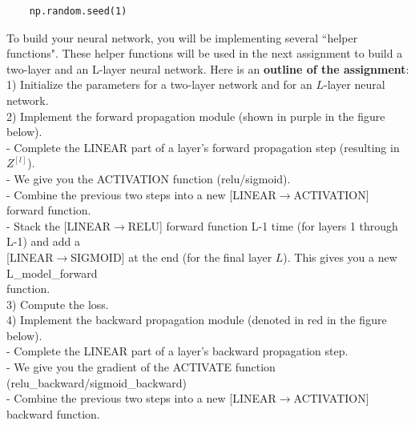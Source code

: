 \documentclass[11pt, a4paper]{article}
\begin{document}
\begin{spacing}{1.1}
\begin{lstlisting}
	np.random.seed(1) \end{lstlisting}
	To build your neural network, you will be implementing several ``helper functions". These helper functions will be used in the next assignment to build a two-layer and an L-layer neural network. Here is an \textbf{outline of the assignment}: \vspace*{1mm} \\
	\hspace*{3mm} 1) Initialize the parameters for a two-layer network and for an $L$-layer neural network. \\
	\hspace*{3mm} 2) Implement the forward propagation module (shown in purple in the figure below). \\
	\hspace*{7mm} - Complete the LINEAR part of a layer's forward propagation step (resulting in $Z^{[l]}$). \\
	\hspace*{7mm} - We give you the ACTIVATION function (relu/sigmoid). \\
	\hspace*{7mm} - Combine the previous two steps into a new [LINEAR$\rightarrow$ACTIVATION] forward function. \\
	\hspace*{7mm} - Stack the [LINEAR$\rightarrow$RELU] forward function L-1 time (for layers 1 through L-1) and add a \\ \hspace*{9.5mm} [LINEAR$\rightarrow$SIGMOID] at the end (for the final layer $L$). This gives you a new L\_model\_forward \\ \hspace*{9.5mm} function. \\
	\hspace*{3mm} 3) Compute the loss. \\
	\hspace*{3mm} 4) Implement the backward propagation module (denoted in red in the figure below). \\
	\hspace*{7mm} - Complete the LINEAR part of a layer's backward propagation step. \\
	\hspace*{7mm} - We give you the gradient of the ACTIVATE function (relu\_backward/sigmoid\_backward)  \\
	\hspace*{7mm} - Combine the previous two steps into a new [LINEAR$\rightarrow$ACTIVATION] backward function. \\

\end{spacing}
\end{document}
